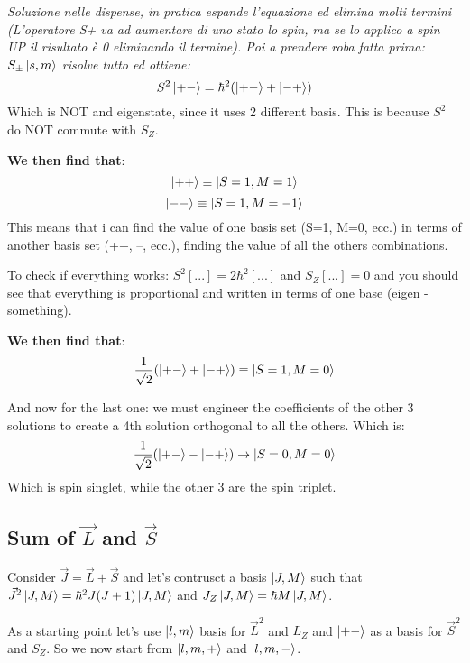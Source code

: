 \textit{Soluzione nelle dispense, in pratica espande l'equazione ed elimina molti termini (L'operatore S+ va ad aumentare di uno stato lo spin, ma se lo applico a spin UP il risultato è 0 eliminando il termine). Poi a prendere roba fatta prima:} $S_{\pm} \ket{s, m}$ \textit{risolve tutto ed ottiene:} $$S^2\ket{+-} = \hbar^2(\ket{+-} + \ket{-+})$$ Which is NOT and eigenstate, since it uses 2 different basis. This is because $S^2$ do NOT commute with $S_Z$.

\vspace{10pt}

\noindent \textbf{We then find that}: $$\ket{++} \equiv \ket{S=1, M=1}$$ $$\ket{--} \equiv \ket{S=1, M=-1}$$ This means that i can find the value of one basis set (S=1, M=0, ecc.) in terms of another basis set (++, --, ecc.), finding the value of all the others combinations.

\vspace{10pt}

\noindent To check if everything works: $S^2[...] = 2\hbar^2[...]$ and $S_Z[...] = 0$ and you should see that everything is proportional and written in terms of one base (eigen - something).

\vspace{10pt}

\noindent \textbf{We then find that}: $$\frac{1}{\sqrt{2}}(\ket{+-} + \ket{-+}) \equiv \ket{S=1, M=0}$$

\vspace{10pt}

\noindent And now for the last one: we must engineer the coefficients of the other 3 solutions to create a 4th solution orthogonal to all the others. Which is: $$\frac{1}{\sqrt{2}}(\ket{+-}-\ket{-+}) \rightarrow \ket{S=0, M=0}$$ Which is spin singlet, while the other 3 are the spin triplet.

\subsection{Sum of $\vec{L}$ and $\vec{S}$}

Consider $\vec{J} = \vec{L} + \vec{S}$ and let's contrusct a basis $\ket{J,M}$ such that $\vec{J}^2\ket{J, M} = \hbar^2J(J+1)\ket{J,M}$ and $J_Z\ket{J,M}=\hbar M\ket{J,M}$.

\vspace{10pt}

\noindent As a starting point let's use $\ket{l,m}$ basis for $\vec{L}^2$ and $L_Z$ and $\ket{+-}$ as a basis for $\vec{S}^2$ and $S_Z$. So we now start from $\ket{l,m,+}$ and $\ket{l,m,-}$.